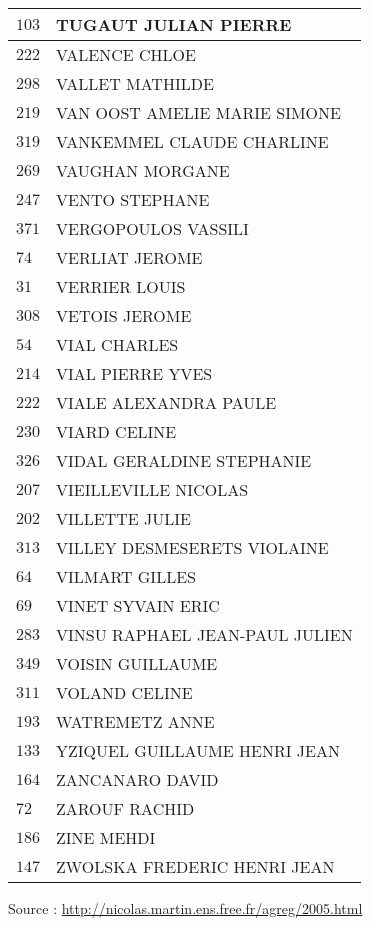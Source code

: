 \begin{xltabular}{\linewidth}{|l|X|}
    \hline
    $103$ & TUGAUT JULIAN PIERRE \\
    \hline
    $222$ & VALENCE CHLOE \\
    \hline
    $298$ & VALLET MATHILDE \\
    \hline
    $219$ & VAN OOST AMELIE MARIE SIMONE \\
    \hline
    $319$ & VANKEMMEL CLAUDE CHARLINE \\
    \hline
    $269$ & VAUGHAN MORGANE \\
    \hline
    $247$ & VENTO STEPHANE \\
    \hline
    $371$ & VERGOPOULOS VASSILI \\
    \hline
    $74$ & VERLIAT JEROME \\
    \hline
    $31$ & VERRIER LOUIS \\
    \hline
    $308$ & VETOIS JEROME \\
    \hline
    $54$ & VIAL CHARLES \\
    \hline
    $214$ & VIAL PIERRE YVES \\
    \hline
    $222$ & VIALE ALEXANDRA PAULE \\
    \hline
    $230$ & VIARD CELINE \\
    \hline
    $326$ & VIDAL GERALDINE STEPHANIE \\
    \hline
    $207$ & VIEILLEVILLE NICOLAS \\
    \hline
    $202$ & VILLETTE JULIE \\
    \hline
    $313$ & VILLEY DESMESERETS VIOLAINE \\
    \hline
    $64$ & VILMART GILLES \\
    \hline
    $69$ & VINET SYVAIN ERIC \\
    \hline
    $283$ & VINSU RAPHAEL JEAN-PAUL JULIEN \\
    \hline
    $349$ & VOISIN GUILLAUME \\
    \hline
    $311$ & VOLAND CELINE \\
    \hline
    $193$ & WATREMETZ ANNE \\
    \hline
    $133$ & YZIQUEL GUILLAUME HENRI JEAN \\
    \hline
    $164$ & ZANCANARO DAVID \\
    \hline
    $72$ & ZAROUF RACHID \\
    \hline
    $186$ & ZINE MEHDI \\
    \hline
    $147$ & ZWOLSKA FREDERIC HENRI JEAN \\
    \hline
  \end{xltabular}

  \begin{flushright}
    {\tiny Source : \url{http://nicolas.martin.ens.free.fr/agreg/2005.html}}
  \end{flushright}

